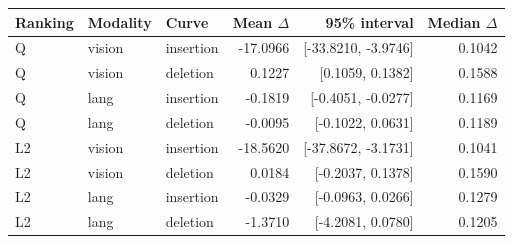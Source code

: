 \begin{tabular}{lllrrr}
\toprule
Ranking & Modality & Curve & Mean $\Delta$ & 95\% interval & Median $\Delta$ \\
\midrule
Q & vision & insertion & -17.0966 & [-33.8210, -3.9746] & 0.1042 \\
Q & vision & deletion & 0.1227 & [0.1059, 0.1382] & 0.1588 \\
Q & lang & insertion & -0.1819 & [-0.4051, -0.0277] & 0.1169 \\
Q & lang & deletion & -0.0095 & [-0.1022, 0.0631] & 0.1189 \\
L2 & vision & insertion & -18.5620 & [-37.8672, -3.1731] & 0.1041 \\
L2 & vision & deletion & 0.0184 & [-0.2037, 0.1378] & 0.1590 \\
L2 & lang & insertion & -0.0329 & [-0.0963, 0.0266] & 0.1279 \\
L2 & lang & deletion & -1.3710 & [-4.2081, 0.0780] & 0.1205 \\
\bottomrule
\end{tabular}
